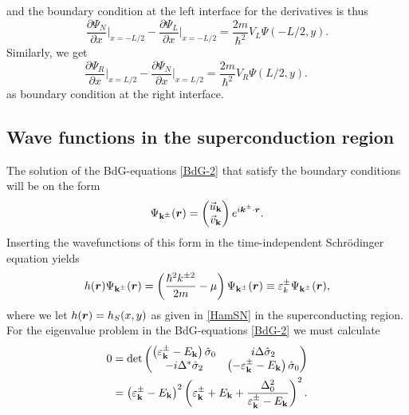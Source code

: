 and the boundary condition at the left interface for the derivatives is thus
\begin{equation}
    \frac{\partial\Psi_N}{\partial x}\bigg|_{x=-L/2} - \frac{\partial\Psi_L}{\partial x}\bigg|_{x=-L/2} = \frac{2m}{\hbar^2}V_L\Psi(-L/2,y).
\end{equation}
Similarly, we get
\begin{equation}
    \frac{\partial\Psi_R}{\partial x}\bigg|_{x=L/2} - \frac{\partial\Psi_N}{\partial x}\bigg|_{x=L/2} = \frac{2m}{\hbar^2}V_R\Psi(L/2,y). \quad \quad
\end{equation}
as boundary condition at the right interface.

\subsection{Wave functions in the superconduction region}
The solution of the BdG-equations \eqref{BdG-2} that satisfy the boundary conditions will be on the form 
\begin{equation}
    \Psi_{\mathbf{k}^{\pm}}(\boldsymbol{r}) = 
    \begin{pmatrix}
    \vec{u}_{\mathbf{k}} \\ \vec{v}_{\mathbf{k}}
    \end{pmatrix}
    e^{i\boldsymbol{k}^{\pm}\cdot \boldsymbol{r}}.
\end{equation}
Inserting the wavefunctions of this form in the time-independent Schrödinger equation yields
\begin{equation}
    h(\boldsymbol{r})\Psi_{\mathbf{k}^{\pm}}(\boldsymbol{r}) = \left(\frac{\hbar^2k^{\pm2}}{2m}-\mu\right)\Psi_{\mathbf{k}^{\pm}}(\boldsymbol{r}) \equiv \varepsilon^{\pm}_{k} \Psi_{\mathbf{k}^{\pm}}(\boldsymbol{r}),
\end{equation}
where we let $h(\boldsymbol{r}) = h_S(x,y)$ as given in \eqref{HamSN} in the superconducting region. For the eigenvalue problem in the BdG-equations \eqref{BdG-2} we must calculate
\begin{equation}
\begin{split}
    0 &= 
    \det\begin{pmatrix}
        \left(\varepsilon^{\pm}_{\mathbf{k}} - E_{\mathbf{k}}\right)\hat{\sigma}_0 & i\Delta\hat{\sigma}_2 \\
        -i\Delta^*\hat{\sigma}_2 & \left(-\varepsilon^{\pm}_{\mathbf{k}} - E_{\mathbf{k}}\right)\hat{\sigma}_0
    \end{pmatrix}
    \\&=
    \left(\varepsilon^{\pm}_{\mathbf{k}}-E_{\mathbf{k}}\right)^2\left(\varepsilon^{\pm}_{\mathbf{k}} + E_{\mathbf{k}} + \frac{\Delta_0^2}{\varepsilon^{\pm}_{\mathbf{k}} - E_{\mathbf{k}}}\right)^2.
\end{split}
\label{det}
\end{equation}

